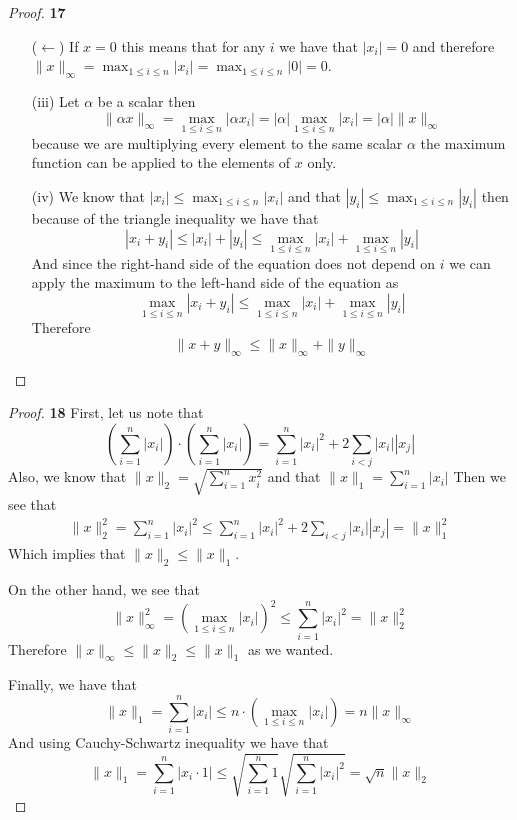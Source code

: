 \documentclass[11pt]{article}
\theoremstyle{definition}
\begin{document}
\begin{proof}{\textbf{17}}
\begin{itemize}
            ($\leftarrow$) If $x = 0$ this means that for any $i$ we have that
            $|x_i| = 0$ and therefore $\|x\| _\infty = \max_{1\leq i\leq n} |x_i| =
            \max_{1\leq i\leq n} |0| = 0$.
            \item [(iii)] Let $\alpha$ be a scalar then
            $$\|\alpha x\|_\infty = \max_{1\leq i\leq n} |\alpha x_i| =
            |\alpha| \max_{1\leq i\leq n} |x_i| = |\alpha| \|x\|_\infty$$
            because we are multiplying every element to the same scalar $\alpha$ the maximum
            function can be applied to the elements of $x$ only.
            \item [(iv)] We know that $|x_i| \leq \max_{1\leq i\leq n} |x_i|$ and that
            $|y_i| \leq \max_{1\leq i\leq n} |y_i|$ then because of the triangle
            inequality we have that
            $$ |x_i + y_i| \leq |x_i| + |y_i|\leq \max_{1\leq i\leq n} |x_i|
            + \max_{1\leq i\leq n} |y_i|$$
            And since the right-hand side of the equation does not depend on $i$ we can
            apply the maximum to the left-hand side of the equation as
            $$\max_{1\leq i\leq n} |x_i + y_i| \leq \max_{1\leq i\leq n} |x_i|
            +\max_{1\leq i\leq n} |y_i|$$
            Therefore
            $$\|x + y\|_\infty \leq \|x\|_\infty + \|y\|_\infty$$
        \end{itemize}
    \end{proof} 
\cleardoublepage
	\begin{proof}{\textbf{18}}
        First, let us note that
        $$(\sum_{i=1}^n |x_i|)\cdot(\sum_{i=1}^n |x_i|) =
        \sum_{i=1}^n |x_i|^2 + 2 \sum_{i<j} |x_i||x_j|$$
        Also, we know that $\|x\|_2 = \sqrt{\sum_{i=1}^n x_i^2}$ and that
        $\|x\|_1 = \sum_{i=1}^n |x_i|$
        Then we see that
        \begin{align*}
            \|x\|_2^2 = \sum_{i=1}^n |x_i|^2 \leq
            \sum_{i=1}^n |x_i|^2 + 2\sum_{i<j} |x_i||x_j| = \|x\|_1^2
        \end{align*}
        Which implies that $\|x\|_2 \leq \|x\|_1$.
        
        On the other hand, we see that
        $$\|x\|_\infty^2 = (\max_{1\leq i \leq n} |x_i|)^2 \leq
        \sum_{i=1}^n |x_i|^2 = \|x\|_2^2$$
        Therefore $\|x\|_\infty \leq \|x\|_2 \leq \|x\|_1$ as we wanted.

        Finally, we have that
        $$\|x\|_1 = \sum_{i=1}^n |x_i| \leq
        n\cdot(\max_{1\leq i \leq n} |x_i|) = n\|x\|_\infty$$
        And using Cauchy-Schwartz inequality we have that
        $$\|x\|_1 = \sum_{i=1}^n |x_i \cdot 1| \leq
        \sqrt{\sum_{i=1}^n 1} \sqrt{\sum_{i=1}^n |x_i|^2} = \sqrt{n}\|x\|_2$$
    \end{proof} 
\end{document}
